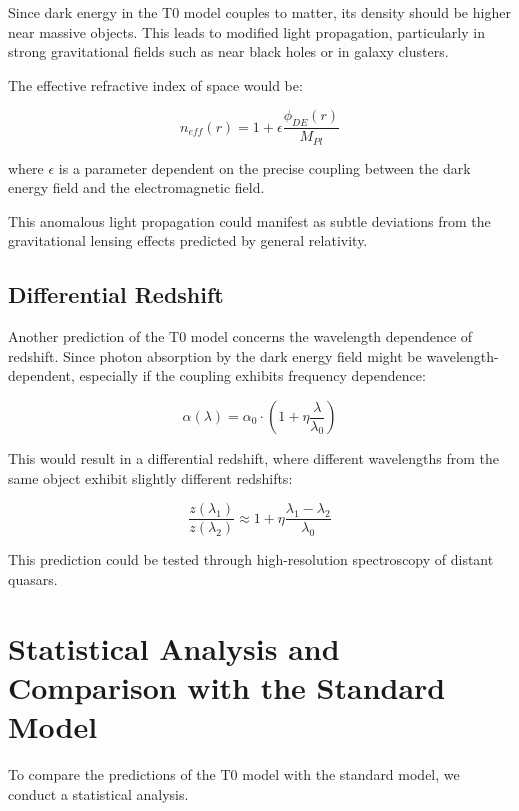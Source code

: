 \documentclass[a4paper,12pt]{article}
\begin{document}
Since dark energy in the T0 model couples to matter, its density should be higher near massive objects. This leads to modified light propagation, particularly in strong gravitational fields such as near black holes or in galaxy clusters.

The effective refractive index of space would be:

\begin{equation}
	n_{eff}(r) = 1 + \epsilon \frac{\phi_{DE}(r)}{M_{Pl}}
\end{equation}

where $\epsilon$ is a parameter dependent on the precise coupling between the dark energy field and the electromagnetic field.

This anomalous light propagation could manifest as subtle deviations from the gravitational lensing effects predicted by general relativity.

\subsection{Differential Redshift}

Another prediction of the T0 model concerns the wavelength dependence of redshift. Since photon absorption by the dark energy field might be wavelength-dependent, especially if the coupling exhibits frequency dependence:

\begin{equation}
	\alpha(\lambda) = \alpha_0 \cdot \left(1 + \eta\frac{\lambda}{\lambda_0}\right)
\end{equation}

This would result in a differential redshift, where different wavelengths from the same object exhibit slightly different redshifts:

\begin{equation}
	\frac{z(\lambda_1)}{z(\lambda_2)} \approx 1 + \eta\frac{\lambda_1 - \lambda_2}{\lambda_0}
\end{equation}

This prediction could be tested through high-resolution spectroscopy of distant quasars.

\section{Statistical Analysis and Comparison with the Standard Model}

To compare the predictions of the T0 model with the standard model, we conduct a statistical analysis.
\end{document}
